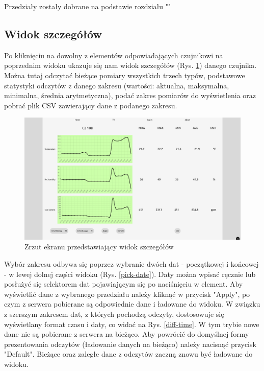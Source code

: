Przedziały zostały dobrane na podstawie rozdziału ""

\subsection{Widok szczegółów}

Po kliknięciu na dowolny z elementów odpowiadających czujnikowi na poprzednim widoku ukazuje się nam widok szczegółów (Rys. \ref{detail-view}) danego czujnika. Można tutaj odczytać
bieżące pomiary wszystkich trzech typów, podstawowe statystyki odczytów z danego zakresu (wartości: aktualna, maksymalna, minimalna, średnia arytmetyczna), 
podać zakres pomiarów do wyświetlenia oraz pobrać plik CSV zawierający dane z podanego zakresu.

\begin{figure}[H]
    \includegraphics[width=\textwidth]{zdj/app/details.png}
    \caption{Zrzut ekranu przedstawiający widok szczegółów}
    \label{detail-view}
\end{figure}

Wybór zakresu odbywa się poprzez wybranie dwóch dat - początkowej i końcowej - w lewej dolnej części widoku (Rys. \ref{pick-date}). Daty można wpisać ręcznie lub posłużyć się
selektorem dat pojawiającym się po naciśnięciu w element. Aby wyświetlić dane z wybranego przedziału należy kliknąć w przycisk "Apply", po czym z serwera pobierane
są odpowiednie dane i ładowane do widoku. W związku z szerszym zakresem dat, z których pochodzą odczyty, dostosowuje się wyświetlany
format czasu i daty, co widać na Rys. \ref{diff-time}.  W tym trybie nowe dane nie są pobierane z serwera na bieżąco. 
Aby powrócić do domyślnej formy prezentowania odczytów (ładowanie danych na bieżąco) należy nacisnąć przycisk "Default". Bieżące oraz zaległe dane z odczytów
zaczną znowu być ładowane do widoku.

